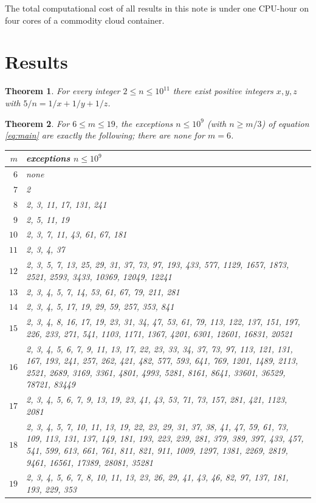 \documentclass[11pt]{amsart}
\newtheorem{theorem}{Theorem}[section]
\theoremstyle{remark}
\theoremstyle{definition}
\begin{document}
The total computational cost of all results in this note is under one
CPU-hour on four cores of a commodity cloud container.

\section{Results}\label{sec:results}

\begin{theorem}\label{thm:sierpinski}
For every integer $2 \le n \le 10^{11}$ there exist positive integers
$x, y, z$ with $5/n = 1/x + 1/y + 1/z$.
\end{theorem}

\begin{theorem}\label{thm:sets}
For $6 \le m \le 19$, the exceptions $n \le 10^9$ (with $n \ge m/3$) of
equation \eqref{eq:main} are exactly the following; there are none for
$m = 6$.
\begin{center}
\small
\begin{tabular}{r p{}}
\hline
$m$ & exceptions $n \le 10^9$ \\
\hline
$6$ & none \\
$7$ & 2 \\
$8$ & 2, 3, 11, 17, 131, 241 \\
$9$ & 2, 5, 11, 19 \\
$10$ & 2, 3, 7, 11, 43, 61, 67, 181 \\
$11$ & 2, 3, 4, 37 \\
$12$ & 2, 3, 5, 7, 13, 25, 29, 31, 37, 73, 97, 193, 433, 577, 1129, 1657, 1873, 2521, 2593, 3433, 10369, 12049, 12241 \\
$13$ & 2, 3, 4, 5, 7, 14, 53, 61, 67, 79, 211, 281 \\
$14$ & 2, 3, 4, 5, 17, 19, 29, 59, 257, 353, 841 \\
$15$ & 2, 3, 4, 8, 16, 17, 19, 23, 31, 34, 47, 53, 61, 79, 113, 122, 137, 151, 197, 226, 233, 271, 541, 1103, 1171, 1367, 4201, 6301, 12601, 16831, 20521 \\
$16$ & 2, 3, 4, 5, 6, 7, 9, 11, 13, 17, 22, 23, 33, 34, 37, 73, 97, 113, 121, 131, 167, 193, 241, 257, 262, 421, 482, 577, 593, 641, 769, 1201, 1489, 2113, 2521, 2689, 3169, 3361, 4801, 4993, 5281, 8161, 8641, 33601, 36529, 78721, 83449 \\
$17$ & 2, 3, 4, 5, 6, 7, 9, 13, 19, 23, 41, 43, 53, 71, 73, 157, 281, 421, 1123, 2081 \\
$18$ & 2, 3, 4, 5, 7, 10, 11, 13, 19, 22, 23, 29, 31, 37, 38, 41, 47, 59, 61, 73, 109, 113, 131, 137, 149, 181, 193, 223, 239, 281, 379, 389, 397, 433, 457, 541, 599, 613, 661, 761, 811, 821, 911, 1009, 1297, 1381, 2269, 2819, 9461, 16561, 17389, 28081, 35281 \\
$19$ & 2, 3, 4, 5, 6, 7, 8, 10, 11, 13, 23, 26, 29, 41, 43, 46, 82, 97, 137, 181, 193, 229, 353 \\
\hline
\end{tabular}
\end{center}
\end{theorem}
\end{document}

